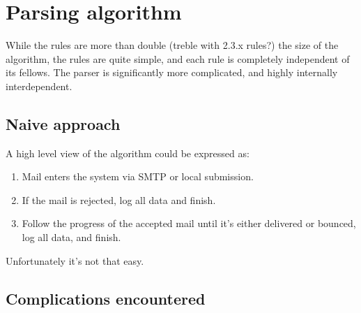 \documentclass[a4paper,12pt,draft]{article}
\begin{document}
\section{Parsing algorithm}

While the rules are more than double (treble with 2.3.x rules?) the size of
the algorithm, the rules are quite simple, and each rule is completely
independent of its fellows.  The parser is significantly more complicated,
and highly internally interdependent.


\subsection{Naive approach}

A high level view of the algorithm could be expressed as:

\begin{enumerate}

    \item Mail enters the system via SMTP or local submission.

    \item If the mail is rejected, log all data and finish.

    \item Follow the progress of the accepted mail until it's either delivered or
        bounced, log all data, and finish.

\end{enumerate}

Unfortunately it's not that easy.


\subsection{Complications encountered}
\end{document}

